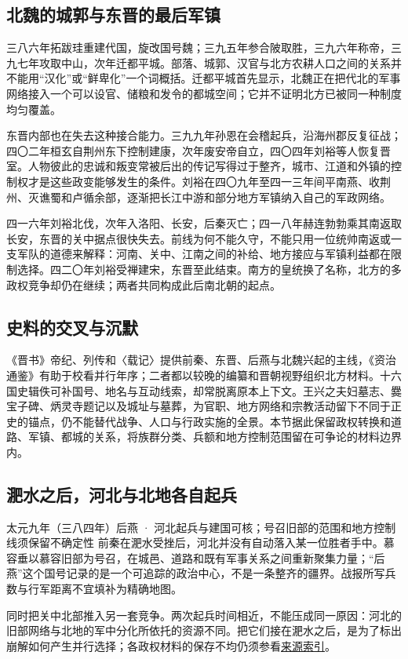 \subsection{北魏的城郭与东晋的最后军镇}

三八六年拓跋珪重建代国，旋改国号魏；三九五年参合陂取胜，三九六年称帝，三九七年攻取中山，次年迁都平城。部落、城郭、汉官与北方农耕人口之间的关系并不能用“汉化”或“鲜卑化”一个词概括。迁都平城首先显示，北魏正在把代北的军事网络接入一个可以设官、储粮和发令的都城空间；它并不证明北方已被同一种制度均匀覆盖。

东晋内部也在失去这种接合能力。三九九年孙恩在会稽起兵，沿海州郡反复征战；四〇二年桓玄自荆州东下控制建康，次年废安帝自立，四〇四年刘裕等人恢复晋室。人物彼此的忠诚和叛变常被后出的传记写得过于整齐，城市、江道和外镇的控制权才是这些政变能够发生的条件。刘裕在四〇九年至四一三年间平南燕、收荆州、灭谯蜀和卢循余部，逐渐把长江中游和部分地方军镇纳入自己的军政网络。

四一六年刘裕北伐，次年入洛阳、长安，后秦灭亡；四一八年赫连勃勃乘其南返取长安，东晋的关中据点很快失去。前线为何不能久守，不能只用一位统帅南返或一支军队的道德来解释：河南、关中、江南之间的补给、地方接应与军镇利益都在限制选择。四二〇年刘裕受禅建宋，东晋至此结束。南方的皇统换了名称，北方的多政权竞争却仍在继续；两者共同构成此后南北朝的起点。

\subsection{史料的交叉与沉默}

《晋书》帝纪、列传和〈载记〉提供前秦、东晋、后燕与北魏兴起的主线，《资治通鉴》有助于校看并行年序；二者都以较晚的编纂和晋朝视野组织北方材料。十六国史辑佚可补国号、地名与互动线索，却常脱离原本上下文。王兴之夫妇墓志、爨宝子碑、炳灵寺题记以及城址与墓葬，为官职、地方网络和宗教活动留下不同于正史的锚点，仍不能替代战争、人口与行政实施的全景。本节据此保留政权转换和道路、军镇、都城的关系，将族群分类、兵额和地方控制范围留在可争论的材料边界内。

\subsection{淝水之后，河北与北地各自起兵}
\begin{event}{}{太元九年（三八四年）}{后燕 · 河北}{起兵与建国可核；号召旧部的范围和地方控制线须保留不确定性}
前秦在淝水受挫后，河北并没有自动落入某一位胜者手中。慕容垂以慕容旧部为号召，在城邑、道路和既有军事关系之间重新聚集力量；“后燕”这个国号记录的是一个可追踪的政治中心，不是一条整齐的疆界。战报所写兵数与行军距离不宜填补为精确地图。

同时把关中北部推入另一套竞争。两次起兵时间相近，不能压成同一原因：河北的旧部网络与北地的军中分化所依托的资源不同。把它们接在淝水之后，是为了标出崩解如何产生并行选择；各政权材料的保存不均仍须参看\hyperref[app:sources]{来源索引}。
\end{event}

